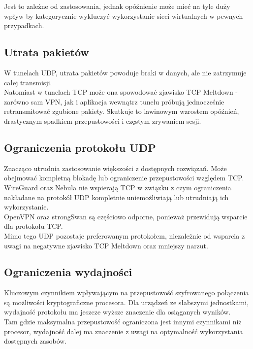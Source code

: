 Jest to zależne od zastosowania, jednak opóźnienie może mieć na tyle duży wpływ by kategorycznie wykluczyć wykorzystanie sieci wirtualnych w pewnych przypadkach.

\subsection{Utrata pakietów}
W tunelach UDP, utrata pakietów powoduje braki w danych, ale nie zatrzymuje całej transmisji.\\

Natomiast w tunelach TCP może ona spowodować zjawisko TCP Meltdown - zarówno sam VPN, jak i aplikacja wewnątrz tunelu próbują jednocześnie retransmitować zgubione pakiety. Skutkuje to lawinowym wzrostem opóźnień, drastycznym spadkiem przepustowości i częstym zrywaniem sesji.

\subsection{Ograniczenia protokołu UDP}
Znacząco utrudnia zastosowanie większości z dostępnych rozwiązań. Może obejmować kompletną blokadę lub ograniczenie przepustowości względem TCP.\\

WireGuard oraz Nebula nie wspierają TCP w związku z czym ograniczenia nakładane na protokół UDP kompletnie uniemożliwiają lub utrudniają ich wykorzystanie.\\
OpenVPN oraz strongSwan są częściowo odporne, ponieważ przewidują wsparcie dla protokołu TCP.\\

Mimo tego UDP pozostaje preferowanym protokołem, niezależnie od wsparcia z uwagi na negatywne zjawisko TCP Meltdown oraz mniejszy narzut.

\newpage

\subsection{Ograniczenia wydajności}

Kluczowym czynnikiem wpływającym na przepustowość szyfrowanego połączenia są możliwości kryptograficzne procesora. Dla urządzeń ze słabszymi jednostkami, wydajność protokołu ma jeszcze wyższe znaczenie dla osiąganych wyników.\\

Tam gdzie maksymalna przepustowość ograniczona jest innymi czynnikami niż procesor, wydajność dalej ma znaczenie z uwagi na optymalność wykorzystania dostępnych zasobów.\\

